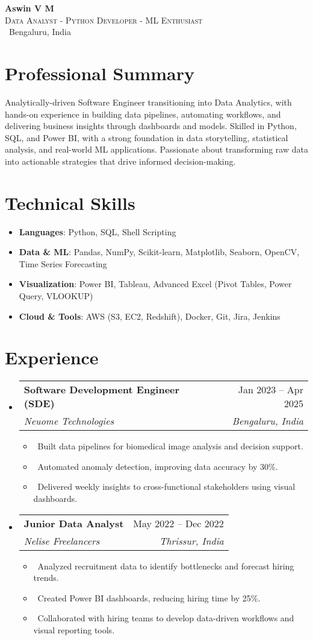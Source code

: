 \documentclass[letterpaper,10pt]{article}
\makeatletter
\newcommand{\resumeItem}[1]{\item\small{#1}}
\newcommand{\resumeSubheading}[4]{
\vspace{2pt}\item
  \begin{tabular*}{0.97\textwidth}[t]{l@{\extracolsep{\fill}}r}
    \textbf{#1} & #2 \\
    \textit{#3} & \textit{#4} \\
  \end{tabular*}\vspace{-5pt}
}
\newcommand{\resumeSubHeadingList}{\begin{itemize}[leftmargin=0.15in, label={}]}
\newcommand{\resumeSubHeadingListEnd}{\end{itemize}}
\makeatother
\begin{document}
\linespread{0.95}

\begin{center}
  \textbf{\Huge Aswin V M} \\
  \textsc{Data Analyst \quad - \quad Python Developer \quad - \quad ML Enthusiast} 
  \\[0.5ex]
  \faMapMarker\ Bengaluru, India \quad
\end{center}

\section*{Professional Summary}
Analytically-driven Software Engineer transitioning into Data Analytics, with hands-on experience in building data pipelines, automating workflows, and delivering business insights through dashboards and models. Skilled in Python, SQL, and Power BI, with a strong foundation in data storytelling, statistical analysis, and real-world ML applications. Passionate about transforming raw data into actionable strategies that drive informed decision-making.

\section{Technical Skills}
\resumeSubHeadingList
\resumeItem{\textbf{Languages}: Python, SQL, Shell Scripting}
\resumeItem{\textbf{Data \& ML}: Pandas, NumPy, Scikit-learn, Matplotlib, Seaborn, OpenCV, Time Series Forecasting}
\resumeItem{\textbf{Visualization}: Power BI, Tableau, Advanced Excel (Pivot Tables, Power Query, VLOOKUP)}
\resumeItem{\textbf{Cloud \& Tools}: AWS (S3, EC2, Redshift), Docker, Git, Jira, Jenkins}
\resumeSubHeadingListEnd

\section{Experience}
\resumeSubHeadingList

\resumeSubheading
{Software Development Engineer (SDE)}{Jan 2023 -- Apr 2025}
{Neuome Technologies}{Bengaluru, India}
\resumeSubHeadingList
\resumeItem{\textbullet\ Built data pipelines for biomedical image analysis and decision support.}
\resumeItem{\textbullet\ Automated anomaly detection, improving data accuracy by 30\%.}
\resumeItem{\textbullet\ Delivered weekly insights to cross-functional stakeholders using visual dashboards.}
\resumeSubHeadingListEnd

\resumeSubheading
{Junior Data Analyst}{May 2022 -- Dec 2022}
{Nelise Freelancers}{Thrissur, India}
\resumeSubHeadingList
\resumeItem{\textbullet\ Analyzed recruitment data to identify bottlenecks and forecast hiring trends.}
\resumeItem{\textbullet\ Created Power BI dashboards, reducing hiring time by 25\%.}
\resumeItem{\textbullet\ Collaborated with hiring teams to develop data-driven workflows and visual reporting tools.}
\resumeSubHeadingListEnd
\resumeSubHeadingListEnd
\end{document}

